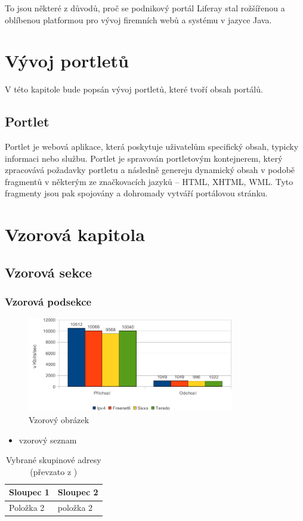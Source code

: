 \documentclass{fithesis}
\begin{document}
To jsou některé z důvodů, proč se podnikový portál Liferay stal rožšířenou a oblíbenou platformou pro vývoj firemních webů a systému v jazyce Java.

\chapter{Vývoj portletů}
V této kapitole bude popsán vývoj portletů, které tvoří obsah portálů.

\section{Portlet}
Portlet je webová aplikace, která poskytuje uživatelům specifický obsah, typicky informaci nebo službu. Portlet je spravován portletovým kontejnerem, který zpracovává požadavky portletu a následně genereju dynamický obsah v podobě fragmentů v některým ze značkovacích jazyků -- HTML, XHTML, WML.  Tyto fragmenty jsou pak spojovány a dohromady vytváří portálovou stránku.

\chapter{Vzorová kapitola}
\section{Vzorová sekce}
\subsection{Vzorová podsekce}

\begin{figure}[htp]
\centering
\includegraphics[width=340px]{images/bandwith.pdf}
\caption{Vzorový obrázek}
\end{figure}

\begin{itemize}
\item vzorový seznam
\end{itemize}


\begin{table}
\centering
\begin{tabular}{|p{3cm}|p{8cm}|}
\hline Sloupec 1 & Sloupec 2 \\
\hline Položka 2 & položka 2 \\
\hline
\end{tabular}
\caption{Vybrané skupinové adresy (převzato z \cite{satrapa-ipv6})}
\end{table}
\end{document}
